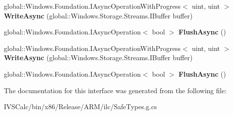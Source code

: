 \begin{DoxyCompactItemize}
\item 
\mbox{\label{interface_windows_1_1_storage_1_1_streams_1_1_i_output_stream_a3c33abbd8925cdb3fd9fb7ae1076bc92}} 
global\+::\+Windows.\+Foundation.\+I\+Async\+Operation\+With\+Progress$<$ uint, uint $>$ {\bfseries Write\+Async} (global\+::\+Windows.\+Storage.\+Streams.\+I\+Buffer buffer)
\item 
\mbox{\label{interface_windows_1_1_storage_1_1_streams_1_1_i_output_stream_a8c8807c37d91cc2417a24d0fc5b06cb1}} 
global\+::\+Windows.\+Foundation.\+I\+Async\+Operation$<$ bool $>$ {\bfseries Flush\+Async} ()
\item 
\mbox{\label{interface_windows_1_1_storage_1_1_streams_1_1_i_output_stream_a3c33abbd8925cdb3fd9fb7ae1076bc92}} 
global\+::\+Windows.\+Foundation.\+I\+Async\+Operation\+With\+Progress$<$ uint, uint $>$ {\bfseries Write\+Async} (global\+::\+Windows.\+Storage.\+Streams.\+I\+Buffer buffer)
\item 
\mbox{\label{interface_windows_1_1_storage_1_1_streams_1_1_i_output_stream_a8c8807c37d91cc2417a24d0fc5b06cb1}} 
global\+::\+Windows.\+Foundation.\+I\+Async\+Operation$<$ bool $>$ {\bfseries Flush\+Async} ()
\end{DoxyCompactItemize}


The documentation for this interface was generated from the following file\+:\begin{DoxyCompactItemize}
\item 
I\+V\+S\+Calc/bin/x86/\+Release/\+A\+R\+M/ilc/Safe\+Types.\+g.\+cs\end{DoxyCompactItemize}

